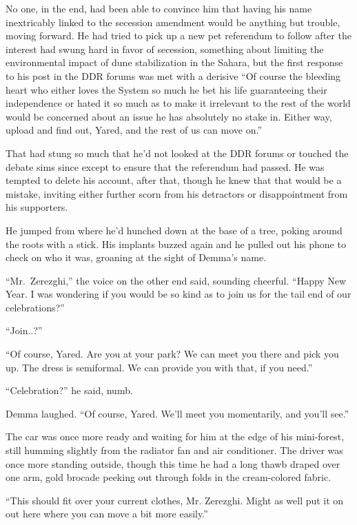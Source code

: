 No one, in the end, had been able to convince him that having his name inextricably linked to the secession amendment would be anything but trouble, moving forward. He had tried to pick up a new pet referendum to follow after the interest had swung hard in favor of secession, something about limiting the environmental impact of dune stabilization in the Sahara, but the first response to his post in the DDR forums was met with a derisive ``Of course the bleeding heart who either loves the System so much he bet his life guaranteeing their independence or hated it so much as to make it irrelevant to the rest of the world would be concerned about an issue he has absolutely no stake in. Either way, upload and find out, Yared, and the rest of us can move on.''

That had stung so much that he'd not looked at the DDR forums or touched the debate sims since except to ensure that the referendum had passed. He was tempted to delete his account, after that, though he knew that that would be a mistake, inviting either further scorn from his detractors or disappointment from his supporters.

He jumped from where he'd hunched down at the base of a tree, poking around the roots with a stick. His implants buzzed again and he pulled out his phone to check on who it was, groaning at the sight of Demma's name.

``Mr.~Zerezghi,'' the voice on the other end said, sounding cheerful. ``Happy New Year. I was wondering if you would be so kind as to join us for the tail end of our celebrations?''

``Join..?''

``Of course, Yared. Are you at your park? We can meet you there and pick you up. The dress is semiformal. We can provide you with that, if you need.''

``Celebration?'' he said, numb.

Demma laughed. ``Of course, Yared. We'll meet you momentarily, and you'll see.''

The car was once more ready and waiting for him at the edge of his mini-forest, still humming slightly from the radiator fan and air conditioner. The driver was once more standing outside, though this time he had a long thawb draped over one arm, gold brocade peeking out through folds in the cream-colored fabric.

``This should fit over your current clothes, Mr. Zerezghi. Might as well put it on out here where you can move a bit more easily.''

